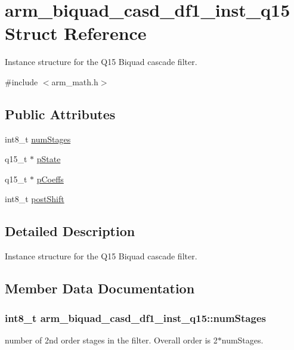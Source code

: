 \hypertarget{structarm__biquad__casd__df1__inst__q15}{}\section{arm\+\_\+biquad\+\_\+casd\+\_\+df1\+\_\+inst\+\_\+q15 Struct Reference}
\label{structarm__biquad__casd__df1__inst__q15}


Instance structure for the Q15 Biquad cascade filter.  




{\ttfamily \#include $<$arm\+\_\+math.\+h$>$}

\subsection*{Public Attributes}
\begin{DoxyCompactItemize}
\item 
int8\+\_\+t \hyperlink{structarm__biquad__casd__df1__inst__q15_ad6d95e70abcf4ff1300181415ad92153}{num\+Stages}
\item 
q15\+\_\+t $\ast$ \hyperlink{structarm__biquad__casd__df1__inst__q15_a5481104ef2f8f81360b80b47d69ae932}{p\+State}
\item 
q15\+\_\+t $\ast$ \hyperlink{structarm__biquad__casd__df1__inst__q15_a1edaacdebb5b09d7635bf20c779855fc}{p\+Coeffs}
\item 
int8\+\_\+t \hyperlink{structarm__biquad__casd__df1__inst__q15_ada7e9d6269e6ed4eacf8f68729e9832d}{post\+Shift}
\end{DoxyCompactItemize}


\subsection{Detailed Description}
Instance structure for the Q15 Biquad cascade filter. 

\subsection{Member Data Documentation}
\subsubsection[{\texorpdfstring{num\+Stages}{numStages}}]{\setlength{\rightskip}{0pt plus 5cm}int8\+\_\+t arm\+\_\+biquad\+\_\+casd\+\_\+df1\+\_\+inst\+\_\+q15\+::num\+Stages}\hypertarget{structarm__biquad__casd__df1__inst__q15_ad6d95e70abcf4ff1300181415ad92153}{}\label{structarm__biquad__casd__df1__inst__q15_ad6d95e70abcf4ff1300181415ad92153}
number of 2nd order stages in the filter. Overall order is 2$\ast$num\+Stages. 
